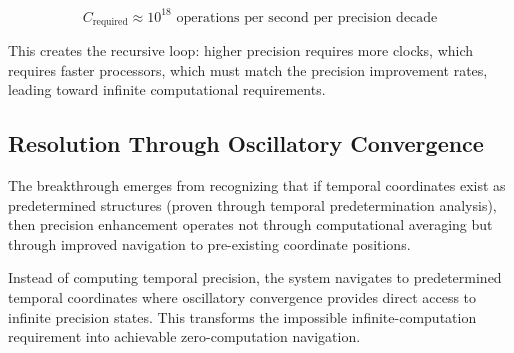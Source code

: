 \documentclass[12pt,a4paper]{article}
\begin{document}
$$C_{\text{required}} \approx 10^{18} \text{ operations per second per precision decade}$$

This creates the recursive loop: higher precision requires more clocks, which requires faster processors, which must match the precision improvement rates, leading toward infinite computational requirements.

\subsection{Resolution Through Oscillatory Convergence}

The breakthrough emerges from recognizing that if temporal coordinates exist as predetermined structures (proven through temporal predetermination analysis), then precision enhancement operates not through computational averaging but through improved navigation to pre-existing coordinate positions.

Instead of computing temporal precision, the system navigates to predetermined temporal coordinates where oscillatory convergence provides direct access to infinite precision states. This transforms the impossible infinite-computation requirement into achievable zero-computation navigation.
\end{document}
